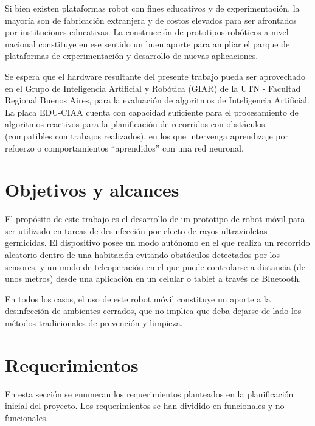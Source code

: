 Si bien existen plataformas robot con fines educativos y de experimentación, la mayoría son de fabricación extranjera y de costos elevados para ser afrontados por instituciones educativas. La construcción de prototipos robóticos a nivel nacional constituye en ese sentido un buen aporte para ampliar el parque de plataformas de experimentación y desarrollo de nuevas aplicaciones.

Se espera que el hardware resultante del presente trabajo pueda ser aprovechado en el Grupo de Inteligencia Artificial y Robótica (GIAR) de la UTN - Facultad Regional Buenos Aires, para la evaluación de algoritmos de Inteligencia Artificial. La placa EDU-CIAA cuenta con capacidad suficiente para el procesamiento de algoritmos reactivos para la planificación de recorridos con obstáculos (compatibles con trabajos realizados), en los que intervenga aprendizaje por refuerzo o comportamientos “aprendidos” con una red neuronal. 


\section{Objetivos y alcances}


El propósito de este trabajo es el desarrollo de un prototipo de robot móvil para ser utilizado en tareas de desinfección por efecto de rayos ultravioletas germicidas.
El dispositivo posee un modo autónomo en el que realiza un recorrido aleatorio dentro de una habitación evitando obstáculos detectados por los sensores, y un modo de teleoperación en el que puede controlarse a distancia (de unos metros) desde una aplicación en un celular o tablet a través de Bluetooth.


En todos los casos, el uso de este robot móvil constituye un aporte a la desinfección de ambientes cerrados, que no implica que deba dejarse de lado los métodos tradicionales de prevención y limpieza. 

\section{Requerimientos}

En esta sección se enumeran los requerimientos planteados en la planificación inicial del proyecto.  Los  requerimientos se han dividido en funcionales y no funcionales.

